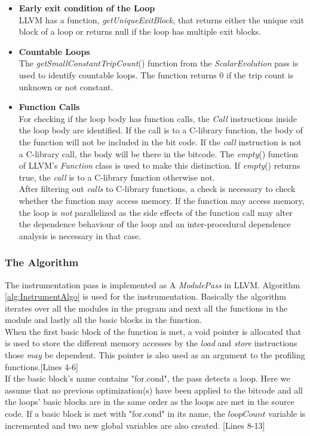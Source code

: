 \documentclass[10pt]{report}          %
\begin{document}
\begin{itemize}

\item \textbf{Early exit condition of the Loop}\\
LLVM has a function, {\em getUniqueExitBlock}, that returns either the unique exit block of a loop or returns null if the loop has multiple exit blocks.

\item \textbf{Countable Loops}\\
The \textit{getSmallConstantTripCount}() function from the \textit{ScalarEvolution} pass is used to identify countable loops.  The function returns 0 if the trip count is unknown or not constant.

\item \textbf{Function Calls}\\
For checking if the loop body has function calls, the \textit{Call} instructions inside the loop body are identified.  If the call is to a C-library function, the body of the function will not be included in the bit code.  If the \textit{call} instruction is not a C-library call, the body will be there in the bitcode.  The \textit{empty}() function of LLVM's \textit{Function} class is used to make this distinction. If \textit{empty}() returns true, the \textit{call} is to a C-library function otherwise not.\\
After filtering out \textit{calls} to C-library functions, a check is necessary to check whether the function may access memory.  If the function may access memory, the loop is \textit{not} parallelized as the side effects of the function call may alter the dependence behaviour of the loop and an inter-procedural dependence analysis is necessary in that case.


\end{itemize}

\subsubsection{The Algorithm}

The instrumentation pass is implemented as A \textit{ModulePass} in LLVM.  Algorithm \ref{alg:InstrumentAlgo} is used for the instrumentation.  Basically the algorithm iterates over all the modules in the program and next all the functions in the module and lastly all the basic blocks in the function. \\
When the first basic block of the function is met, a void pointer is allocated that is used to store the different memory accesses by the \textit{load} and \textit{store} instructions those \textit{may} be dependent. This pointer is also used as an argument to the profiling functions.[Lines 4-6] \\
If the basic block's name contains "for.cond", the pass detects a loop.  Here we assume that no previous optimization(s) have been applied to the bitcode and all the loops' basic blocks are in the same order as the loops are met in the source code.  If a basic block is met with "for.cond" in its name, the $loopCount$ variable is incremented and two new global variables are also created. [Lines 8-13]
\end{document}
